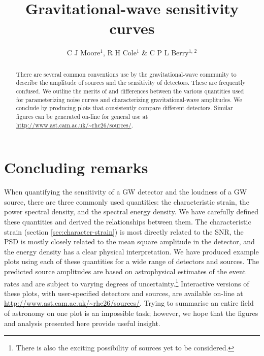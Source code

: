 \documentclass[fleqn,12pt]{iopart}
\begin{document}
\title{Gravitational-wave sensitivity curves}
\author{C J Moore$^1$, R H Cole$^1$ \& C P L Berry$^{1,\,2}$}
\address{$^1$ Institute of Astronomy, Madingley Road, Cambridge, CB3 0HA, United Kingdom}
\address{$^2$ School of Physics and Astronomy, University of Birmingham, Edgbaston, Birmingham B15 2TT, United Kingdom}

\begin{abstract}
There are several common conventions use by the gravitational-wave community to describe the amplitude of sources and the sensitivity of detectors. These are frequently confused. We outline the merits of and differences between the various quantities used for parameterizing noise curves and characterizing gravitational-wave amplitudes. We conclude by producing plots that consistently compare different detectors. Similar figures can be generated on-line for general use at \url{http://www.ast.cam.ac.uk/~rhc26/sources/}.
\end{abstract}







\section{Concluding remarks}\label{sec:discussion}

When quantifying the sensitivity of a GW detector and the loudness of a GW source, there are three commonly used quantities: the characteristic strain, the power spectral density, and the spectral energy density. We have carefully defined these quantities and derived the relationships between them. The characteristic strain (section \ref{sec:character-strain}) is most directly related to the SNR, the PSD is mostly closely related to the mean square amplitude in the detector, and the energy density has a clear physical interpretation. We have produced example plots using each of these quantities for a wide range of detectors and sources. The predicted source amplitudes are based on astrophysical estimates of the event rates and are subject to varying degrees of uncertainty.\footnote{There is also the exciting possibility of sources yet to be considered.} Interactive versions of these plots, with user-specified detectors and sources, are available on-line at \url{http://www.ast.cam.ac.uk/~rhc26/sources/}. Trying to summarise an entire field of astronomy on one plot is an impossible task; however, we hope that the figures and analysis presented here provide useful insight.





%
\end{document}

